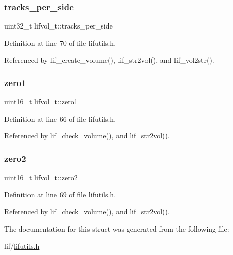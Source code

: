 \subsubsection{\texorpdfstring{tracks\+\_\+per\+\_\+side}{tracks\_per\_side}}
{\footnotesize\ttfamily uint32\+\_\+t lifvol\+\_\+t\+::tracks\+\_\+per\+\_\+side}



Definition at line 70 of file lifutils.\+h.



Referenced by lif\+\_\+create\+\_\+volume(), lif\+\_\+str2vol(), and lif\+\_\+vol2str().

\mbox{\label{structlifvol__t_a5e749ae4bff79deaa813966cff04f431}} 
\subsubsection{\texorpdfstring{zero1}{zero1}}
{\footnotesize\ttfamily uint16\+\_\+t lifvol\+\_\+t\+::zero1}



Definition at line 66 of file lifutils.\+h.



Referenced by lif\+\_\+check\+\_\+volume(), and lif\+\_\+str2vol().

\mbox{\label{structlifvol__t_ac05fef8e2c908110de7083d7afbfdb37}} 
\subsubsection{\texorpdfstring{zero2}{zero2}}
{\footnotesize\ttfamily uint16\+\_\+t lifvol\+\_\+t\+::zero2}



Definition at line 69 of file lifutils.\+h.



Referenced by lif\+\_\+check\+\_\+volume(), and lif\+\_\+str2vol().



The documentation for this struct was generated from the following file\+:\begin{DoxyCompactItemize}
\item 
lif/\hyperlink{lifutils_8h}{lifutils.\+h}\end{DoxyCompactItemize}
